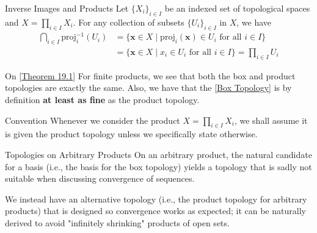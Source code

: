 \begin{remarkBox}{Inverse Images and Products}
    Let \( \{ X_{ i } \}_{ i \in I } \) be an indexed set of topological spaces
    and \( X = \prod_{ i \in I } X_{ i } \).
    For any collection of subsets \( \{ U_{ i } \}_{ i \in I } \) in \( X \),
    we have
    \begin{equation*}
        \begin{aligned}
            \bigcap_{ i \in I } \mathrm{proj}_{ i }^{ -1 } ( U_{ i } )
            &=
            \{ \mathbf{x} \in X \mid \mathrm{proj}_{ i } ( \mathbf{x} ) \in 
            U_{ i } \text{ for all } i \in I \}
            \\
            &=
            \{ \mathbf{x} \in X \mid x_{ i } \in U_{ i } \text{ for all } 
            i \in I \}
            =
            \prod_{ i \in I } U_{ i }
        \end{aligned}
    \end{equation*}
\end{remarkBox}

\begin{remarkBox}{On [\hyperlink{thm:19.1}{Theorem 19.1}]}
    For finite products, we see that both the box and product topologies are
    exactly the same.
    Also, we have that the [\hyperlink{15_box_top}{Box Topology}] is by 
    definition \textbf{at least as fine} as the product topology.
\end{remarkBox}

\begin{remarkBox}{Convention}
    Whenever we consider the product \( X = \prod_{ i \in I } X_{ i } \), we 
    shall assume it is given the product topology unless we specifically 
    state otherwise.
\end{remarkBox}

\begin{remarkBox}{Topologies on Arbitrary Products}
    On an arbitrary product, the natural candidate for a basis (i.e., the basis
    for the box topology) yields a topology that is sadly not suitable when discussing convergence of sequences.

    \baseSkip

    We instead have an alternative topology (i.e., the product topology for 
    arbitrary products) that is designed so convergence 
    works as expected; it can be naturally derived to avoid "infinitely
    shrinking" products of open sets.
\end{remarkBox}